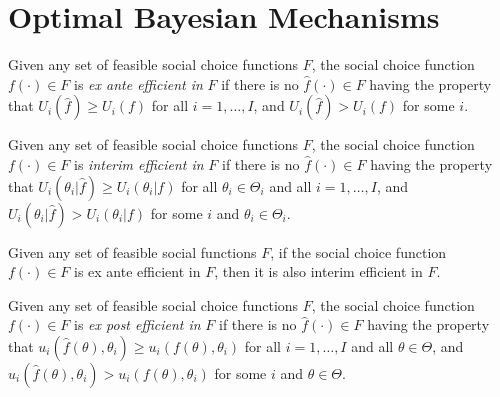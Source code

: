 \section{Optimal Bayesian Mechanisms}

\begin{defn}
    Given any set of feasible social choice functions $F$, the social choice function $f(\cdot) \in F$ is \emph{ex ante efficient in} $F$ if there is no $\hat{f}(\cdot) \in F$ having the property that $U_i(\hat{f}) \geq U_i(f)$ for all $i = 1, \dots, I$, and $U_i(\hat{f}) > U_i(f)$ for some $i$.
\end{defn}

\begin{defn}
    Given any set of feasible social choice functions $F$, the social choice function $f(\cdot) \in F$ is \emph{interim efficient in} $F$ if there is no $\hat{f}(\cdot) \in F$ having the property that $U_i(\theta_i | \hat{f}) \geq U_i(\theta_i | f)$ for all $\theta_i \in \Theta_i$ and all $i = 1, \dots, I$, and $U_i(\theta_i | \hat{f}) > U_i(\theta_i | f)$ for some $i$ and $\theta_i \in \Theta_i$.
\end{defn}

\begin{prop}
    Given any set of feasible social functions $F$, if the social choice function $f(\cdot) \in F$ is ex ante efficient in $F$, then it is also interim efficient in $F$.
\end{prop}

\begin{defn}
    Given any set of feasible social choice functions $F$, the social choice function $f(\cdot) \in F$ is \emph{ex post efficient in} $F$ if there is no $\hat{f}(\cdot) \in F$ having the property that $u_i(\hat{f}(\theta), \theta_i) \geq u_i(f(\theta), \theta_i)$ for all $i = 1, \dots, I$ and all $\theta \in \Theta$, and $u_i(\hat{f}(\theta), \theta_i) > u_i(f(\theta), \theta_i)$ for some $i$ and $\theta \in \Theta$.
\end{defn}
